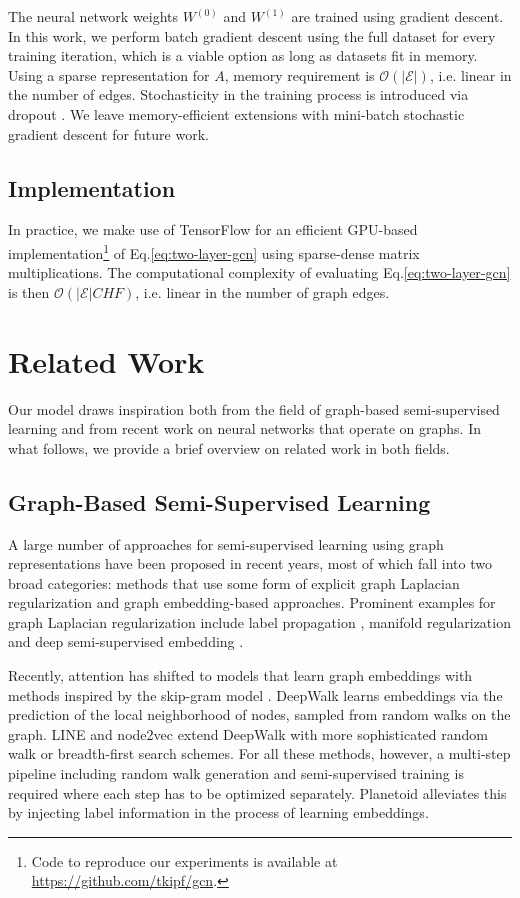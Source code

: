 \documentclass{article} %
\makeatletter
\newcommand*{\ie}{i.e.\@\xspace}
\newcommand*{\eq}{Eq.\@\xspace}
\makeatother
\begin{document}
The neural network weights $W^{(0)}$ and $W^{(1)}$ are trained using gradient descent. In this work, we perform batch gradient descent using the full dataset for every training iteration, which is a viable option as long as datasets fit in memory. Using a sparse representation for $A$, memory requirement is $\mathcal{O}(|\mathcal{E}|)$, \ie linear in the number of edges. Stochasticity in the training process is introduced via dropout \citep{srivastava2014dropout}. We leave memory-efficient extensions with mini-batch stochastic gradient descent for future work.

\subsection{Implementation} In practice, we make use of TensorFlow \citep{tensorflow2015-whitepaper} for an efficient GPU-based implementation\footnote{Code to reproduce our experiments is available at \url{https://github.com/tkipf/gcn}.} of \eq \ref{eq:two-layer-gcn} using sparse-dense matrix multiplications. The computational complexity of evaluating \eq \ref{eq:two-layer-gcn} is then $\mathcal{O}(|\mathcal{E}|CHF)$, \ie linear in the number of graph edges.


\section{Related Work}
Our model draws inspiration both from the field of graph-based semi-supervised learning and from recent work on neural networks that operate on graphs. In what follows, we provide a brief overview on related work in both fields.

\subsection{Graph-Based Semi-Supervised Learning}
A large number of approaches for semi-supervised learning using graph representations have been proposed in recent years, most of which fall into two broad categories: methods that use some form of explicit graph Laplacian regularization and graph embedding-based approaches. Prominent examples for graph Laplacian regularization include label propagation \citep{zhu2003semi}, manifold regularization \citep{belkin2006manifold} and deep semi-supervised embedding \citep{weston2012deep}. %

Recently, attention has shifted to models that learn graph embeddings with methods inspired by the skip-gram model \citep{mikolov2013distributed}. DeepWalk \citep{perozzi2014deepwalk} learns embeddings via the prediction of the local neighborhood of nodes, sampled from random walks on the graph. LINE \citep{tang2015line} and node2vec \citep{grovernode2vec} extend DeepWalk with more sophisticated random walk or breadth-first search schemes. For all these methods, however, a multi-step pipeline including random walk generation and semi-supervised training is required where each step has to be optimized separately. Planetoid \citep{yang2016revisiting} alleviates this by injecting label information in the process of learning embeddings.
\end{document}
